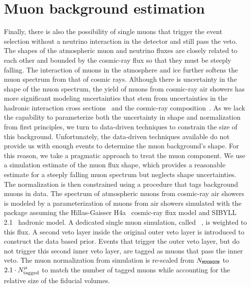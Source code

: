 \section{Muon background estimation}\label{sec:muon_background}
Finally, there is also the possibility of single muons that trigger the event selection without a neutrino interaction in the detector and still pass the veto.
The shapes of the atmospheric muon and neutrino fluxes are closely related to each other and bounded by the cosmic-ray flux so that they must be steeply falling.
The interaction of muons in the atmosphere and ice further softens the muon spectrum from that of cosmic rays.
Although there is uncertainty in the shape of the muon spectrum, the yield of muons from cosmic-ray air showers has more significant modeling uncertainties that stem from uncertainties in the hadronic interaction cross sections~\cite{Pierog:2017nes} and the cosmic-ray composition~\cite{Bluemer:2009zf}.
As we lack the capability to parameterize both the uncertainty in shape and normalization from first principles, we turn to data-driven techniques to constrain the size of this background.
Unfortunately, the data-driven techniques available do not provide us with enough events to determine the muon background's shape.
For this reason, we take a pragmatic approach to treat the muon component.
We use a simulation estimate of the muon flux shape, which provides a reasonable estimate for a steeply falling muon spectrum but neglects shape uncertainties.
The normalization is then constrained using a procedure that tags background muons in data.
The spectrum of atmospheric muons from cosmic-ray air showers is modeled by a parameterization of muons from air showers simulated with the \CORSIKA~\cite{Heck:1998vt} package assuming the Hillas-Gaisser H4a~\cite{Gaisser:2013bla} cosmic-ray flux model and SIBYLL 2.1~\cite{Ahn:2009wx} hadronic model.
A dedicated single muon simulation, called \MUONGUN~\cite{jvsthesis}, is weighted to this flux. 
A second veto layer inside the original outer veto layer is introduced to construct the data based prior.
Events that trigger the outer veto layer, but do not trigger this second inner veto layer, are tagged as muons that pass the inner veto.
The muon normalization from simulation is re-scaled from $N_{\texttt{MUONGUN}}$ to $2.1\cdot N^\mu_\textmd{tagged}$ to match the number of tagged muons while accounting for the relative size of the fiducial volumes.
